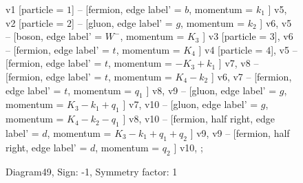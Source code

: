 \documentclass{revtex4}
\begin{document}
\begin{figure}[!htb]
\begin{center}
{    %
v1 [particle = \(1\)] -- [fermion, edge label' = \(b\), momentum = \(k_{1}\) ] v5, 
v2 [particle = \(2\)] -- [gluon, edge label' = \(g\), momentum = \(k_{2}\) ] v6, 
v5 -- [boson, edge label' = \(W^{-}\), momentum = \(K_{3}\) ] v3 [particle = \(3\)], 
v6 -- [fermion, edge label' = \(t\), momentum = \(K_{4}\) ] v4 [particle = \(4\)], 
v5 -- [fermion, edge label' = \(t\), momentum = \(-K_{3} + k_{1}\) ] v7, 
v8 -- [fermion, edge label' = \(t\), momentum = \(K_{4} - k_{2}\) ] v6, 
v7 -- [fermion, edge label' = \(t\), momentum = \(q_{1}\) ] v8, 
v9 -- [gluon, edge label' = \(g\), momentum = \(K_{3} - k_{1} + q_{1}\) ] v7, 
v10 -- [gluon, edge label' = \(g\), momentum = \(K_{4} - k_{2} - q_{1}\) ] v8, 
v10 -- [fermion, half right, edge label' = \(d\), momentum = \(K_{3} - k_{1} + q_{1} + q_{2}\) ] v9, 
v9 -- [fermion, half right, edge label' = \(d\), momentum = \(q_{2}\) ] v10, 
};
\end{center}
\caption{Diagram49, Sign: -1, Symmetry factor: 1}
\end{figure}
\newpage
\end{document}
